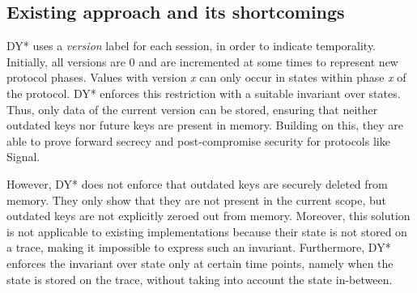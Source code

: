 \documentclass{article}
\begin{document}
\subsection{Existing approach and its shortcomings}
\label{sec:existing-approach-dy}


DY* uses a \emph{version} label for each session, in order to indicate temporality. Initially, all versions are 0 and are incremented at some times to represent new protocol phases. Values with version \textit{x} can only occur in states within phase \textit{x} of the protocol. DY* enforces this restriction with a suitable invariant over states. Thus, only data of the current version can be stored, ensuring that neither outdated keys nor future keys are present in memory. Building on this, they are able to prove forward secrecy and post-compromise security for protocols like Signal.

However, DY* does not enforce that outdated keys are securely deleted from memory. They only show that they are not present in the current scope, but outdated keys are not explicitly zeroed out from memory.
Moreover, this solution is not applicable to existing implementations because their state is not stored on a trace, making it impossible to express such an invariant.
Furthermore, DY* enforces the invariant over state only at certain time points, namely when the state is stored on the trace, without taking into account the state in-between.

\end{document}
